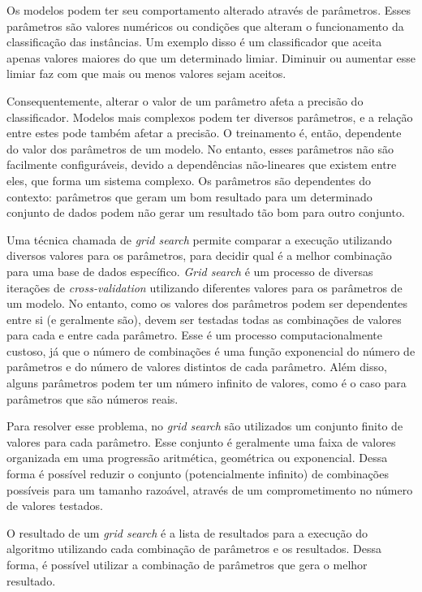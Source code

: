 Os modelos podem ter seu comportamento alterado através de parâmetros. Esses parâmetros são valores numéricos ou condições que alteram o funcionamento da classificação das instâncias. Um exemplo disso é um classificador que aceita apenas valores maiores do que um determinado limiar. Diminuir ou aumentar esse limiar faz com que mais ou menos valores sejam aceitos.

Consequentemente, alterar o valor de um parâmetro afeta a precisão do classificador. Modelos mais complexos podem ter diversos parâmetros, e a relação entre estes pode também afetar a precisão. O treinamento é, então, dependente do valor dos parâmetros de um modelo. No entanto, esses parâmetros não são facilmente configuráveis, devido a dependências não-lineares que existem entre eles, que forma um sistema complexo. Os parâmetros são dependentes do contexto: parâmetros que geram um bom resultado para um determinado conjunto de dados podem não gerar um resultado tão bom para outro conjunto.

Uma técnica chamada de \emph{grid search} permite comparar a execução utilizando diversos valores para os parâmetros, para decidir qual é a melhor combinação para uma base de dados específico. \emph{Grid search} é um processo de diversas iterações de \emph{cross-validation} utilizando diferentes valores para os parâmetros de um modelo. No entanto, como os valores dos parâmetros podem ser dependentes entre si (e geralmente são), devem ser testadas todas as combinações de valores para cada e entre cada parâmetro. Esse é um processo computacionalmente custoso, já que o número de combinações é uma função exponencial do número de parâmetros e do número de valores distintos de cada parâmetro. Além disso, alguns parâmetros podem ter um número infinito de valores, como é o caso para parâmetros que são números reais.

Para resolver esse problema, no \emph{grid search} são utilizados um conjunto finito de valores para cada parâmetro. Esse conjunto é geralmente uma faixa de valores organizada em uma progressão aritmética, geométrica ou exponencial. Dessa forma é possível reduzir o conjunto (potencialmente infinito) de combinações possíveis para um tamanho razoável, através de um comprometimento no número de valores testados.

O resultado de um \emph{grid search} é a lista de resultados para a execução do algoritmo utilizando cada combinação de parâmetros e os resultados. Dessa forma, é possível utilizar a combinação de parâmetros que gera o melhor resultado.

